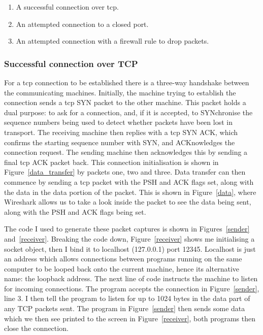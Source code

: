 \documentclass[titlepage]{article}
\let\Oldsubsubsection\subsubsection{}
\renewcommand{\subsubsection}{\FloatBarrier\Oldsubsubsection}
\begin{document}
\begin{enumerate}
  \item{A successful connection over \gls{tcp}.}
  \item{An attempted connection to a closed port.}
  \item{An attempted connection with a firewall rule to drop packets.}
\end{enumerate}

\subsubsection{Successful connection over TCP}
For a \gls{tcp} connection to be established there is a 
three-way handshake between the communicating machines.
Initially, the machine trying to establish the connection sends a \gls{tcp} SYN packet to the other machine.
This packet holds a dual purpose\cite{rfc:tcp}: to ask for a connection, and, if it is accepted, to SYNchronise the 
sequence numbers being used to detect whether packets have been lost in transport.
The receiving machine then replies with a \gls{tcp} SYN ACK, which confirms the starting sequence
number with SYN, and ACKnowledges the connection request.
The sending machine then acknowledges this by sending a final \gls{tcp} ACK packet back. 
This connection initialisation is shown in Figure~\ref{data_transfer} by packets one, two and three. 
Data transfer can then commence by sending a \gls{tcp} packet with the PSH and ACK flags set, along 
with the data in the data portion of the packet. This is shown in Figure~\ref{data}, where Wireshark
allows us to take a look inside the packet to see the data being sent, along with the 
PSH and ACK flags being set. 

The code I used to generate these packet captures is shown in
Figures~\ref{sender} and~\ref{receiver}.
Breaking the code down, Figure~\ref{receiver} shows me initialising a 
socket object\cite{python:socket}, then I bind it to localhost (127.0.0.1) port 12345.
Localhost is just an address which allows connections between programs running on the
same computer to be looped back onto the current machine, hence its alternative name:
the loopback address. 
The next line of code instructs the machine to listen for incoming connections.
The program accepts the connection in Figure~\ref{sender}, line 3.
I then tell the program to listen for up to 1024 bytes in the data part of any TCP packets sent.
The program in Figure~\ref{sender} then sends some data which we then see
printed to the screen in Figure~\ref{receiver}, both programs 
then close the connection.
\end{document}
